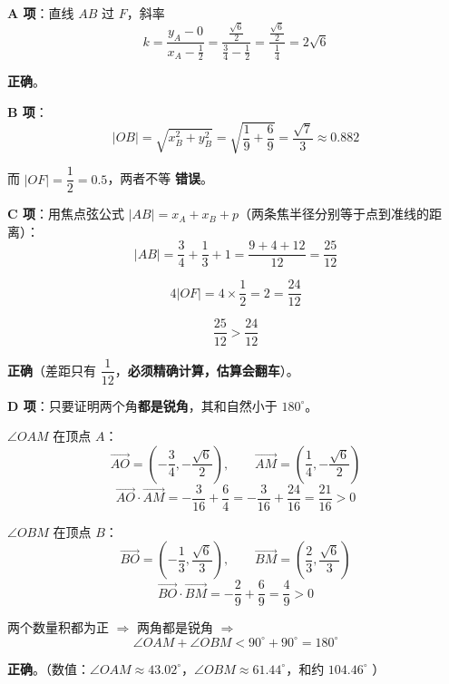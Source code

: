 \begin{answer}
\par\medskip

\textbf{A 项}：直线 $AB$ 过 $F$，斜率
\nopagebreak[4]
\[k=\frac{y_A-0}{x_A-\frac12}=\frac{\frac{\sqrt6}2}{\frac34-\frac12}=\frac{\frac{\sqrt6}2}{\frac14}=2\sqrt6\]

 \textbf{正确}。

\par\medskip

\textbf{B 项}：
\nopagebreak[4]
\[|OB|=\sqrt{x_B^{2}+y_B^{2}}=\sqrt{\frac19+\frac69}=\frac{\sqrt7}3\approx0.882\]

而 $|OF|=\dfrac12=0.5$，两者不等  \textbf{错误}。

\par\medskip

\textbf{C 项}：用焦点弦公式 $|AB|=x_A+x_B+p$（两条焦半径分别等于点到准线的距离）：
\nopagebreak[4]
\[|AB|=\frac34+\frac13+1=\frac{9+4+12}{12}=\frac{25}{12}\]

\nopagebreak[4]
\[4|OF|=4\times\frac12=2=\frac{24}{12}\]

\nopagebreak[4]
\[\frac{25}{12}>\frac{24}{12}\]

 \textbf{正确}（差距只有 $\dfrac1{12}$，\textbf{必须精确计算，估算会翻车}）。

\par\medskip

\textbf{D 项}：只要证明两个角\textbf{都是锐角}，其和自然小于 $180^\circ$。

$\angle OAM$ 在顶点 $A$：
\nopagebreak[4]
\[\overrightarrow{AO}=\left(-\frac34,-\frac{\sqrt6}2\right),\qquad\overrightarrow{AM}=\left(\frac14,-\frac{\sqrt6}2\right)\]
\nopagebreak[4]
\[\overrightarrow{AO}\cdot\overrightarrow{AM}=-\frac3{16}+\frac64=-\frac3{16}+\frac{24}{16}=\frac{21}{16}>0\]

$\angle OBM$ 在顶点 $B$：
\nopagebreak[4]
\[\overrightarrow{BO}=\left(-\frac13,\frac{\sqrt6}3\right),\qquad\overrightarrow{BM}=\left(\frac23,\frac{\sqrt6}3\right)\]
\nopagebreak[4]
\[\overrightarrow{BO}\cdot\overrightarrow{BM}=-\frac29+\frac69=\frac49>0\]

两个数量积都为正 $\Rightarrow$ 两角都是锐角 $\Rightarrow$
\nopagebreak[4]
\[\angle OAM+\angle OBM<90^\circ+90^\circ=180^\circ\]

 \textbf{正确}。（数值：$\angle OAM\approx43.02^\circ$，$\angle OBM\approx61.44^\circ$，和约 $104.46^\circ$ ）


\end{answer}
